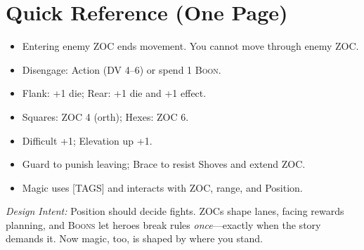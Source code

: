 \documentclass[11pt]{article}
\newcommand{\Boon}{\textsc{Boon}}
\newcommand{\Boons}{\textsc{Boons}}
\newcommand{\DV}{\textsc{DV}}
\begin{document}
\section{Quick Reference (One Page)}
\begin{itemize}
  \item Entering enemy ZOC ends movement. You cannot move through enemy ZOC.
  \item Disengage: Action (\DV{} 4–6) or spend 1 \Boon{}.
  \item Flank: +1 die; Rear: +1 die and +1 effect.
  \item Squares: ZOC 4 (orth); Hexes: ZOC 6.
  \item Difficult +1; Elevation up +1.
  \item Guard to punish leaving; Brace to resist Shoves and extend ZOC.
  \item Magic uses [TAGS] and interacts with ZOC, range, and Position.
\end{itemize}

\bigskip
\noindent\textit{Design Intent:} Position should decide fights. ZOCs shape lanes, facing rewards planning, and \Boons{} let heroes break rules \emph{once}—exactly when the story demands it. Now magic, too, is shaped by where you stand.
\end{document}

